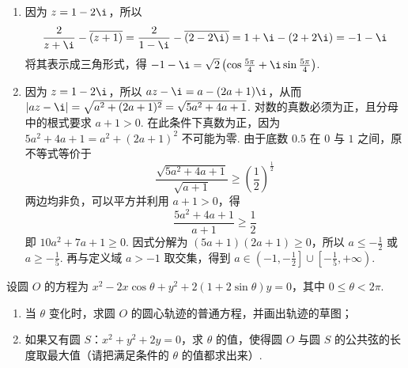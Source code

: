 \begin{solution}
\begin{enumerate}
\item 因为 \(z = 1 - 2\i\)，所以
\[
\frac{2}{z + \i} - \overline{\left(z + 1\right)}
= \frac{2}{1 - \i} - \overline{\left(2 - 2\i\right)}
= 1 + \i - \left(2 + 2\i\right)
= -1 - \i
\]
将其表示成三角形式，得 \(-1 - \i = \sqrt{2}\left(\cos \frac{5\pi}{4} + \i \sin \frac{5\pi}{4}\right)\).

\item 因为 \(z=1-2\i\)，所以 \(az-\i=a-(2a+1)\i\)，从而 \(|az-\i|=\sqrt{a^2+(2a+1)^2}=\sqrt{5a^2+4a+1}\). 对数的真数必须为正，且分母中的根式要求 \(a+1>0\). 在此条件下真数为正，因为 \(5a^2+4a+1=a^2+(2a+1)^2\) 不可能为零. 由于底数 \(0.5\) 在 \(0\) 与 \(1\) 之间，原不等式等价于
\[
\frac{\sqrt{5a^2+4a+1}}{\sqrt{a+1}}\geqslant\left(\frac12\right)^{\frac{1}{2}}
\]
两边均非负，可以平方并利用 \(a+1>0\)，得
\[
\frac{5a^2+4a+1}{a+1}\geqslant\frac12
\]
即 \(10a^2+7a+1\geqslant0\). 因式分解为 \((5a+1)(2a+1)\geqslant0\)，所以 \(a\leqslant-\frac12\) 或 \(a\geqslant-\frac15\). 再与定义域 \(a>-1\) 取交集，得到 \(a\in\left(-1,-\frac12\right]\cup\left[-\frac15,+\infty\right)\).
\end{enumerate}
\end{solution}

\begin{problem}

设圆 \(O\) 的方程为 \(x^2 - 2x\cos \theta + y^2 + 2(1 + 2\sin \theta)y = 0\)，其中 \(0\leqslant\theta<2\pi\).

\begin{enumerate}
\item 当 \(\theta\) 变化时，求圆 \(O\) 的圆心轨迹的普通方程，并画出轨迹的草图；
\item 如果又有圆 \(S\)：\(x^2 + y^2 + 2y = 0\)，求 \(\theta\) 的值，使得圆 \(O\) 与圆 \(S\) 的公共弦的长度取最大值（请把满足条件的 \(\theta\) 的值都求出来）.
\end{enumerate}
\end{problem}

